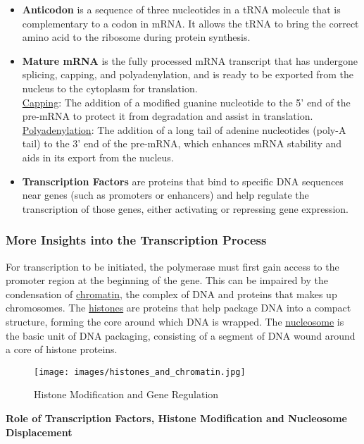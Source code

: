 \documentclass[a4paper]{article}
\begin{document}
\begin{itemize}
  \item \textbf{Anticodon} is a sequence of three nucleotides in a tRNA 
  molecule that is complementary to a codon in mRNA. It allows the tRNA to 
  bring the correct amino acid to the ribosome during protein synthesis.

  \item \textbf{Mature mRNA} is the fully processed mRNA transcript that has 
  undergone splicing, capping, and polyadenylation, and is ready to be exported 
  from the nucleus to the cytoplasm for translation.  \\ \underline{Capping}:
  The addition of a modified guanine nucleotide to the 5' end of the pre-mRNA 
  to protect it from degradation and assist in translation.
  \\ \underline{Polyadenylation}: The addition of a long tail of adenine 
  nucleotides (poly-A tail) to the 3' end of the pre-mRNA, which enhances mRNA 
  stability and aids in its export from the nucleus.

  \item \textbf{Transcription Factors} are proteins that bind to specific DNA 
  sequences near genes (such as promoters or enhancers) and help regulate the 
  transcription of those genes, either activating or repressing gene expression.
\end{itemize}


\subsubsection*{More Insights into the Transcription Process}

For transcription to be initiated, the polymerase must first gain access to
the promoter region at the beginning of the gene. This can be impaired by 
the condensation of \underline{chromatin}, the complex of DNA and proteins
that makes up chromosomes. The \underline{histones} are proteins that help
package DNA into a compact structure, forming the core around which DNA is
wrapped. The \underline{nucleosome} is the basic unit of DNA packaging,
consisting of a segment of DNA wound around a core of histone proteins.

\begin{figure}[H]
  \centering
  \texttt{[image: images/histones\_and\_chromatin.jpg]}
  \caption{Histone Modification and Gene Regulation}
\end{figure}

\textbf{Role of Transcription Factors, Histone Modification and Nucleosome Displacement}
\end{document}
